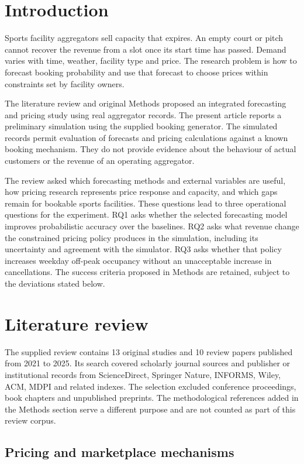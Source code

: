 \section{Introduction}
Sports facility aggregators sell capacity that expires. An empty court or pitch cannot recover the revenue from a slot once its start time has passed. Demand varies with time, weather, facility type and price. The research problem is how to forecast booking probability and use that forecast to choose prices within constraints set by facility owners.

The literature review and original Methods proposed an integrated forecasting and pricing study using real aggregator records. The present article reports a preliminary simulation using the supplied booking generator. The simulated records permit evaluation of forecasts and pricing calculations against a known booking mechanism. They do not provide evidence about the behaviour of actual customers or the revenue of an operating aggregator.

The review asked which forecasting methods and external variables are useful, how pricing research represents price response and capacity, and which gaps remain for bookable sports facilities. These questions lead to three operational questions for the experiment. RQ1 asks whether the selected forecasting model improves probabilistic accuracy over the baselines. RQ2 asks what revenue change the constrained pricing policy produces in the simulation, including its uncertainty and agreement with the simulator. RQ3 asks whether that policy increases weekday off-peak occupancy without an unacceptable increase in cancellations. The success criteria proposed in Methods are retained, subject to the deviations stated below.

\section{Literature review}
The supplied review contains 13 original studies and 10 review papers published from 2021 to 2025. Its search covered scholarly journal sources and publisher or institutional records from ScienceDirect, Springer Nature, INFORMS, Wiley, ACM, MDPI and related indexes. The selection excluded conference proceedings, book chapters and unpublished preprints. The methodological references added in the Methods section serve a different purpose and are not counted as part of this review corpus.


\subsection{Pricing and marketplace mechanisms}

